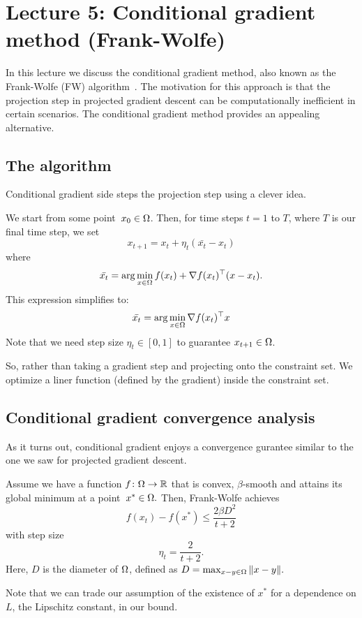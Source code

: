 \section{Lecture 5: Conditional gradient method (Frank-Wolfe)}

In this lecture we discuss the conditional gradient method, also known as the
Frank-Wolfe (FW) algorithm~\cite{Frank1956}. The motivation for this approach is
that the projection step in projected gradient descent can be computationally
inefficient in certain scenarios. The conditional gradient method provides an
appealing alternative.

\subsection{The algorithm}
Conditional gradient side steps the projection step using a clever idea.

We start from some point~$x_0\in\Omega$. Then, for time steps $t = 1$ to $T$, 
where $T$ is our final time step, we set
\[
x_{t+1} = x_t + \eta_t(\bar{x_t}-x_t)
\]
where
$$ \bar{x_t} = \arg\min_{x\in \Omega} f(x_t) + \nabla f(x_t) ^\top (x-x_t).$$
This expression simplifies to:
$$ \bar{x_t} = \arg\min_{x\in \Omega} \nabla f(x_t) ^\top x $$
Note that we need step size $\eta_t \in [0,1]$ to guarantee $x_{t+1} \in \Omega$.

So, rather than taking a gradient step and projecting onto the constraint set.
We optimize a liner function (defined by the gradient) inside the constraint
set.

\subsection{Conditional gradient convergence analysis}

As it turns out, conditional gradient enjoys a convergence gurantee similar to
the one we saw for projected gradient descent.

\begin{theorem}
Assume we have a function $f\colon\Omega\to\mathbb{R}$ that is convex, $\beta$-smooth
and attains its global minimum at a point~$x^*\in\Omega.$ Then, Frank-Wolfe achieves
$$ f(x_t) - f(x^*) \leq \frac{2\beta D^2}{t+2}$$
with step size $$\eta_t = \frac{2}{t+2}.$$
Here, $D$ is the diameter of $\Omega$, defined as
$ D = \max_{x-y \in \Omega} \| x-y \|.$ 
\end{theorem}
Note that we can trade our assumption of the existence of $x^*$ for a dependence on $L$, the Lipschitz constant, in our bound.

